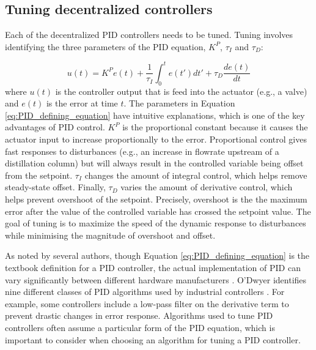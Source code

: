
\subsection{Tuning decentralized controllers}
Each of the decentralized PID controllers needs to be tuned. Tuning involves identifying the three parameters of the PID equation, $K^P$, $\tau_I$ and $\tau_D$:

\begin{equation}
    \label{eq:PID_defining_equation}
    u(t) = K^P e(t) + \frac{1}{\tau_I}\int_0^t e(t')dt' + \tau_D \frac{de(t)}{dt}
\end{equation}
where $u(t)$ is the controller output that is feed into the actuator (e.g., a valve) and $e(t)$ is the error at time $t$.
The parameters in Equation \ref{eq:PID_defining_equation} have intuitive explanations, which is one of the key advantages of PID control. $K^P$ is the proportional constant because it causes the actuator input to increase proportionally to the error. Proportional control gives fast responses to disturbances (e.g., an increase in flowrate upstream of a distillation column) but will always result in the controlled variable being offset from the setpoint. $\tau_I$ changes the amount of integral control, which helps remove steady-state offset.  Finally, $\tau_D$ varies the amount of derivative control, which helps prevent overshoot of the setpoint. Precisely, overshoot is the the maximum error after the value of the controlled variable has crossed the setpoint value. The goal of tuning is to maximize the speed of the dynamic response to disturbances while minimising the magnitude of overshoot and offset. 
    
As noted by several authors, though Equation \ref{eq:PID_defining_equation} is the textbook definition for a PID controller, the actual implementation of PID can vary significantly between different hardware manufacturers \cite{ODwyer2009, KiamHeongAng2005}.  O'Dwyer identifies nine different classes of PID algorithms used by industrial controllers \cite{ODwyer2009}. For example, some controllers include a low-pass filter on the derivative term to prevent drastic changes in error response. Algorithms used to tune PID controllers often assume a particular form of the PID equation, which is important to consider when choosing an algorithm for tuning a PID controller.  

